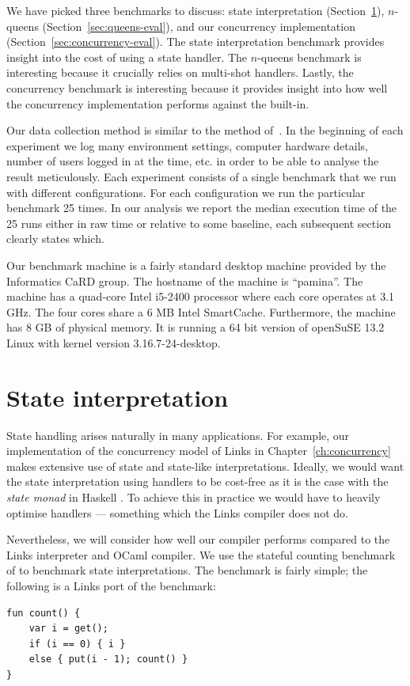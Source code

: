\documentclass[12pt,mscres,cdtppar,twoside,openright,logo,rightchapter,normalheadings]{infthesis}
\theoremstyle{definition}
\begin{document}
We have picked three benchmarks to discuss: state interpretation
(Section~\ref{sec:state-eval}), $n$-queens
(Section~\ref{sec:queens-eval}), and our concurrency implementation
(Section~\ref{sec:concurrency-eval}). The state interpretation
benchmark provides insight into the cost of using a state handler. The
$n$-queens benchmark is interesting because it crucially relies on
multi-shot handlers. Lastly, the concurrency benchmark is interesting
because it provides insight into how well the concurrency
implementation performs against the built-in.

Our data collection method is similar to the method
of~\cite{Harris2016}. In the beginning of each experiment we log many
environment settings, computer hardware details, number of users
logged in at the time, etc. in order to be able to analyse the result
meticulously. Each experiment consists of a single benchmark that we
run with different configurations. For each configuration we run the
particular benchmark 25 times. In our analysis we report the median
execution time of the 25 runs either in raw time or relative to some
baseline, each subsequent section clearly states which.

Our benchmark machine is a fairly standard desktop machine provided by
the Informatics CaRD group. The hostname of the machine is
``pamina''. The machine has a quad-core Intel i5-2400 processor where
each core operates at 3.1 GHz. The four cores share a 6 MB Intel
SmartCache. Furthermore, the machine has 8 GB of physical memory. It
is running a 64 bit version of openSuSE 13.2 Linux with kernel version
3.16.7-24-desktop.
%

\section{State interpretation}
\label{sec:state-eval}

State handling arises naturally in many applications. For example, our
implementation of the concurrency model of Links in
Chapter~\ref{ch:concurrency} makes extensive use of state and
state-like interpretations. Ideally, we would want the state
interpretation using handlers to be cost-free as it is the case with
the \emph{state monad} in Haskell \citep{Kammar2013}. To achieve this
in practice we would have to heavily optimise handlers --- something
which the Links compiler does not do.

Nevertheless, we will consider how well our compiler performs compared
to the Links interpreter and OCaml compiler. We use the stateful
counting benchmark of \cite{Kammar2013} to benchmark state
interpretations. The benchmark is fairly simple; the following is a
Links port of the benchmark:
\begin{lstlisting}
fun count() {
    var i = get();
    if (i == 0) { i }
    else { put(i - 1); count() }
}
\end{lstlisting}
\end{document}
